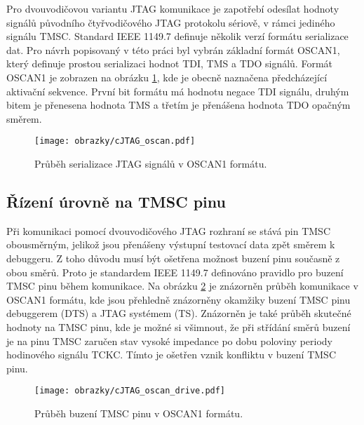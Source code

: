 Pro dvouvodičovou variantu \acs{JTAG} komunikace je zapotřebí odesílat hodnoty signálů původního čtyřvodičového \acs{JTAG} protokolu sériově, v rámci jediného signálu TMSC. Standard IEEE 1149.7 definuje několik verzí formátu serializace dat. Pro návrh popisovaný v této práci byl vybrán základní formát OSCAN1, který definuje prostou serializaci hodnot \acs{TDI}, \acs{TMS} a \acs{TDO} signálů. Formát OSCAN1 je zobrazen na obrázku \ref{fig:oscan}, kde je obecně naznačena předcházející aktivační sekvence. První bit formátu má hodnotu negace \acs{TDI} signálu, druhým bitem je přenesena hodnota \acs{TMS} a třetím je přenášena hodnota \acs{TDO}	opačným směrem. \cite{IEEE_1149-7}

\begin{figure}[!h]
  \begin{center}
    \texttt{[image: obrazky/cJTAG\_oscan.pdf]}
  \end{center}
  \caption{Průběh serializace \acs{JTAG} signálů v OSCAN1 formátu.}
	\label{fig:oscan}
\end{figure}
    
\subsection{Řízení úrovně na TMSC pinu}	\label{subsec:oscan1_drive} 
Při komunikaci pomocí dvouvodičového \acs{JTAG} rozhraní se stává pin TMSC obousměrným, jelikož jsou přenášeny výstupní testovací data zpět směrem k debuggeru. Z toho důvodu musí být ošetřena možnost buzení pinu současně z obou směrů. Proto je standardem IEEE 1149.7 definováno pravidlo pro buzení TMSC pinu během komunikace. Na obrázku \ref{fig:oscan_drive} je znázorněn průběh komunikace v OSCAN1 formátu, kde jsou přehledně znázorněny okamžiky buzení TMSC pinu debuggerem (\acs{DTS}) a \acs{JTAG} systémem (\acs{TS}). Znázorněn je také průběh skutečné hodnoty na TMSC pinu, kde je možné si všimnout, že při střídání směrů buzení je na pinu TMSC zaručen stav vysoké impedance po dobu poloviny periody hodinového signálu TCKC. Tímto je ošetřen vznik konfliktu v buzení TMSC pinu. \cite{IEEE_1149-7}

\begin{figure}[!h]
  \begin{center}
    \texttt{[image: obrazky/cJTAG\_oscan\_drive.pdf]}
  \end{center}
  \caption{Průběh buzení TMSC pinu v OSCAN1 formátu.}
	\label{fig:oscan_drive}
\end{figure}

